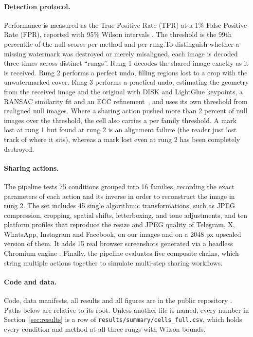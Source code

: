 \documentclass[10pt,twocolumn]{article}
\newcommand{\rf}[1]{\texttt{\small #1}}
\begin{document}
\paragraph{Detection protocol.}
Performance is measured as the True Positive Rate (TPR) at a 1\% False Positive Rate (FPR), reported with 95\% Wilson intervals \cite{wilson1927}. The threshold is the 99th percentile of the null scores per method and per rung.To distinguish whether a missing watermark was destroyed or merely misaligned, each image is decoded three times across distinct ``rungs''. Rung 1 decodes the shared image exactly as it is received. Rung 2 performs a perfect undo, filling regions lost to a crop with the unwatermarked cover. Rung 3 performs a practical undo, estimating the geometry from the received image and the original with DISK \cite{tyszkiewicz2020disk} and LightGlue \cite{lindenberger2023lightglue} keypoints, a RANSAC similarity fit and an ECC refinement~\cite{evangelidis2008ecc}, and uses its own threshold from realigned null images. Where a sharing action pushed more than 2 percent of null images over the threshold, the cell also carries a per family threshold. A mark lost at rung 1 but found at rung 2 is an alignment failure (the reader just lost track of where it sits), whereas a mark lost even at rung 2 has been completely destroyed.

\paragraph{Sharing actions.}
The pipeline tests 75 conditions grouped into 16 families, recording the exact parameters of each action and its inverse in order to reconstruct the image in rung 2. The set includes 45 single algorithmic transformations, such as JPEG compression, cropping, spatial shifts, letterboxing, and tone adjustments, and ten platform profiles that reproduce the resize and JPEG quality of Telegram, X, WhatsApp, Instagram and Facebook, on our images and on a 2048 px upscaled version of them. It adds 15 real browser screenshots generated via a headless Chromium engine \cite{playwright}. Finally, the pipeline evaluates five composite chains, which string multiple actions together to simulate multi-step sharing workflows.

\paragraph{Code and data.}
Code, data manifests, all results and all figures are in the public repository \cite{wmbench2026}. Paths below are relative to its root. Unless another file is named, every number in Section~\ref{sec:results} is a row of \rf{results/summary/cells\_full.csv}, which holds every condition and method at all three rungs with Wilson bounds.
\end{document}
